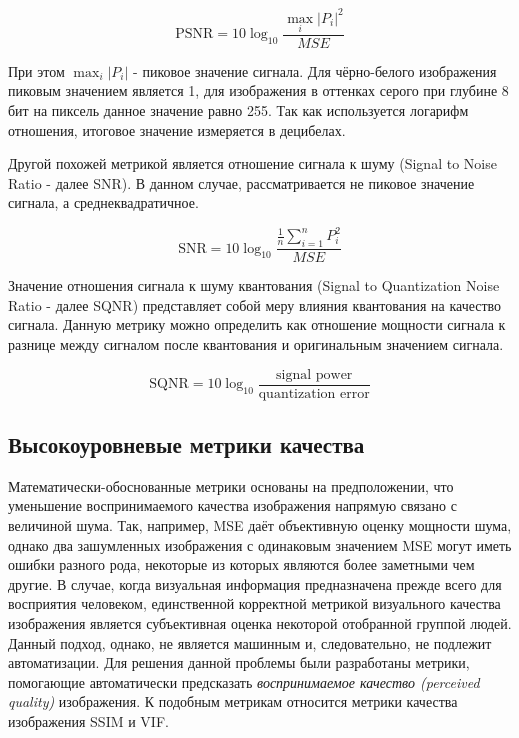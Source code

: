 \begin{equation} \label{eq:img_psnr}
    \text{PSNR} = 10\log_{10} \frac{\max_{i}\left|P_{i}\right|^{2}}{MSE}
\end{equation}

При этом $\max_{i}\left|P_{i}\right|$ - пиковое значение сигнала. Для
чёрно-белого изображения пиковым значением является 1, для изображения в
оттенках серого при глубине 8 бит на пиксель данное значение равно 255. Так как
используется логарифм отношения, итоговое значение измеряется в децибелах.


Другой похожей метрикой является отношение сигнала к шуму (Signal to Noise Ratio
- далее SNR). В данном случае, рассматривается не пиковое значение сигнала, а
среднеквадратичное.

\begin{equation} \label{eq:img_snr}
    \text{SNR} = 10\log_{10} \frac{\frac{1}{n}\sum_{i=1}^{n} P_{i}^{2}}{MSE}
\end{equation}

Значение отношения сигнала к шуму квантования (Signal to Quantization Noise
Ratio - далее SQNR) представляет собой меру влияния квантования на качество
сигнала. Данную метрику можно определить как отношение мощности сигнала к
разнице между сигналом после квантования и оригинальным значением сигнала.

\begin{equation} \label{eq:img_sqnr}
    \text{SQNR} = 10\log_{10} \frac{\text{signal power}}{\text{quantization error}}
\end{equation}

\subsection{Высокоуровневые метрики качества}


Математически-обоснованные метрики основаны на предположении, что уменьшение
воспринимаемого качества изображения напрямую связано с величиной шума. Так,
например, MSE даёт объективную оценку мощности шума, однако два зашумленных
изображения с одинаковым значением MSE могут иметь ошибки разного рода,
некоторые из которых являются более заметными чем другие. В случае, когда
визуальная информация предназначена прежде всего для восприятия человеком,
единственной корректной метрикой визуального качества изображения является
субъективная оценка некоторой отобранной группой людей\cite{SSIMArticle}. Данный
подход, однако, не является машинным и, следовательно, не подлежит
автоматизации. Для решения данной проблемы были разработаны метрики, помогающие
автоматически предсказать \textit{воспринимаемое качество (perceived quality)}
изображения. К подобным метрикам относится метрики качества изображения SSIM и
VIF.


